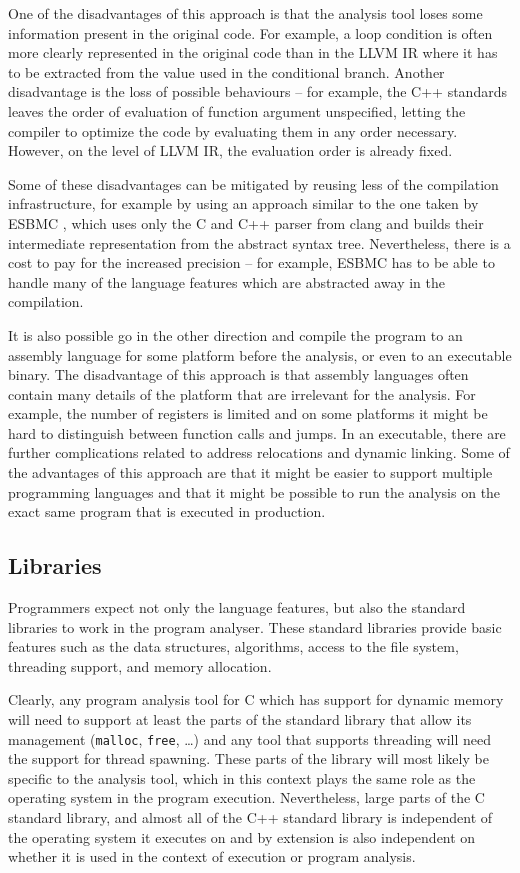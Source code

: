 One of the disadvantages of this approach is that the analysis tool loses some
information present in the original code.
For example, a loop condition is often more clearly represented in the original
code than in the LLVM IR where it has to be extracted from the value used in
the conditional branch.
Another disadvantage is the loss of possible behaviours -- for example, the C++ standards leaves the order of evaluation of function argument unspecified, letting the compiler to optimize the code by evaluating them in any order necessary.
However, on the level of LLVM IR, the evaluation order is already fixed.

Some of these disadvantages can be mitigated by reusing less of the compilation
infrastructure, for example by using an approach similar to the one taken by
ESBMC , which uses only the C and C++ parser from clang and
builds their intermediate representation from the abstract syntax tree.
Nevertheless, there is a cost to pay for the increased precision -- for example, ESBMC has to be able to handle many of the language features which are abstracted away in the compilation.

It is also possible go in the other direction and compile the program to an assembly language for some platform before the analysis, or even to an executable binary.
The disadvantage of this approach is that assembly languages often contain many details of the platform that are irrelevant for the analysis.
For example, the number of registers is limited and on some platforms it might be hard to distinguish between function calls and jumps.
In an executable, there are further complications related to address relocations and dynamic linking.
Some of the advantages of this approach are that it might be easier to support multiple programming languages and that it might be possible to run the analysis on the exact same program that is executed in production.

\subsection{Libraries}

Programmers expect not only the language features, but also the standard
libraries to work in the program analyser.
These standard libraries provide basic features such as the data structures, algorithms, access to the file system, threading support, and memory allocation.

Clearly, any program analysis tool for C which has support for dynamic memory will need to support at least the parts of the standard library that allow its management (\texttt{malloc}, \texttt{free}, …) and any tool that supports threading will need the support for thread spawning.
These parts of the library will most likely be specific to the analysis tool,
which in this context plays the same role as the operating system in the
program execution.
Nevertheless, large parts of the C standard library, and almost all of the C++
standard library is independent of the operating system it executes on and by
extension is also independent on whether it is used in the context of execution
or program analysis.

